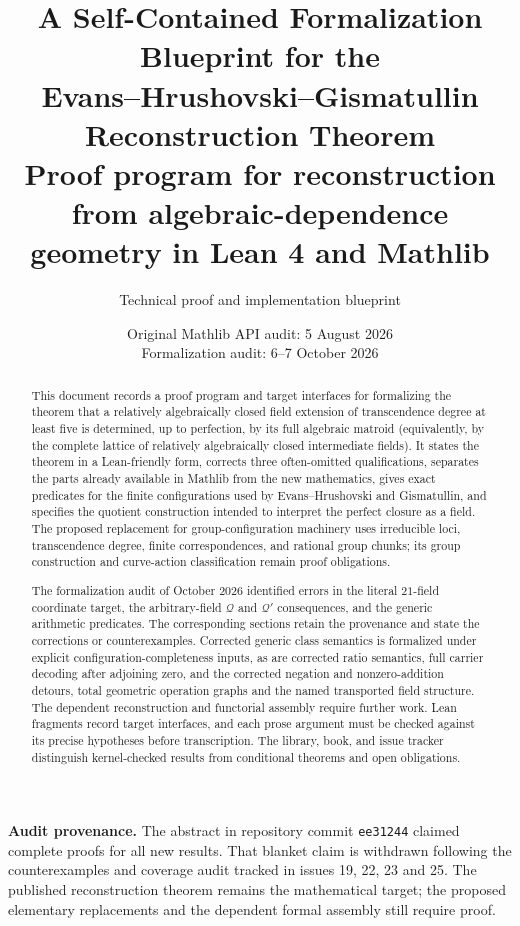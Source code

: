 \documentclass[11pt,oneside]{article}
\title{\bfseries A Self-Contained Formalization Blueprint for the\\
Evans--Hrushovski--Gismatullin Reconstruction Theorem\\[4pt]
\large Proof program for reconstruction from algebraic-dependence geometry in Lean 4 and Mathlib}
\author{Technical proof and implementation blueprint}
\date{Original Mathlib API audit: 5 August 2026\\Formalization audit: 6--7 October 2026}
\theoremstyle{definition}
\theoremstyle{remark}
\newcommand{\Qrel}{\mathcal{Q}}
\newcommand{\Qprel}{\mathcal{Q}'}
\begin{document}
\maketitle

\begin{abstract}
This document records a proof program and target interfaces for formalizing the theorem that a
relatively algebraically closed field extension of transcendence degree at least five is
determined, up to perfection, by its full algebraic matroid (equivalently, by the complete
lattice of relatively algebraically closed intermediate fields).  It states the theorem in
a Lean-friendly form, corrects three often-omitted qualifications, separates the parts already
available in Mathlib from the new mathematics, gives exact predicates for the finite
configurations used by Evans--Hrushovski and Gismatullin, and specifies the quotient
construction intended to interpret the perfect closure as a field.  The proposed replacement
for group-configuration machinery uses irreducible loci, transcendence degree, finite
correspondences, and rational group chunks; its group construction and curve-action
classification remain proof obligations.

The formalization audit of October 2026 identified errors in the literal $21$-field
coordinate target, the arbitrary-field $\Qrel$ and $\Qprel$ consequences, and the generic
arithmetic predicates.  The corresponding sections retain the provenance and state the
corrections or counterexamples. Corrected generic class semantics is formalized under
explicit configuration-completeness inputs, as are corrected ratio semantics,
full carrier decoding after adjoining zero, and the corrected negation and nonzero-addition
detours, total geometric operation graphs and the named transported field structure.
The dependent reconstruction and functorial assembly require further work. Lean fragments
record target interfaces, and each prose argument must be checked against its precise
hypotheses before transcription.  The library, book, and issue tracker distinguish
kernel-checked results from conditional theorems and open obligations.
\end{abstract}

\noindent\textbf{Audit provenance.}
The abstract in repository commit \texttt{ee31244} claimed complete proofs for all
new results. That blanket claim is withdrawn following the counterexamples and
coverage audit tracked in issues 19, 22, 23 and 25. The published reconstruction
theorem remains the mathematical target; the proposed elementary replacements and
the dependent formal assembly still require proof.
\end{document}
